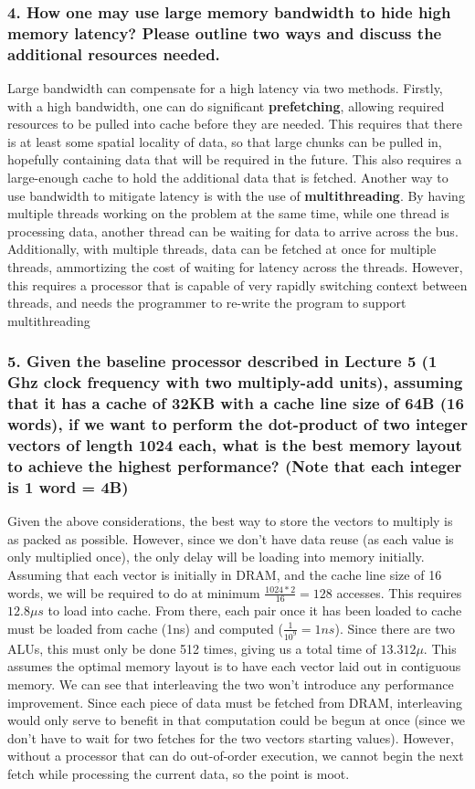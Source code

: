 \documentclass[titlepage]{article}
\begin{document}
\subsubsection*{4. How one may use large memory bandwidth to hide high memory 
latency? Please outline two ways and discuss the additional resources needed.}
Large bandwidth can compensate for a high latency via two methods. Firstly,
with a high bandwidth, one can do significant \textbf{prefetching}, allowing
required resources to be pulled into cache before they are needed. This
requires that there is at least some spatial locality of data, so that large
chunks can be pulled in, hopefully containing data that will be required in the
future. This also requires a large-enough cache to hold the additional data
that is fetched. Another way to use bandwidth to mitigate latency is with the
use of \textbf{multithreading}. By having multiple threads working on the
problem at the same time, while one thread is processing data, another thread
can be waiting for data to arrive across the bus. Additionally, with multiple
threads, data can be fetched at once for multiple threads, ammortizing the cost
of waiting for latency across the threads. However, this requires a processor
that is capable of very rapidly switching context between threads, and needs
the programmer to re-write the program to support multithreading
\subsubsection*{5. Given the baseline processor described in Lecture 5 (1 Ghz 
clock frequency with two multiply-add units), assuming that it has a cache of 
32KB with a cache line size of 64B (16 words), if we want to perform the 
dot-product of two integer vectors of length 1024 each, what is the best memory
layout to achieve the highest performance? (Note that each integer is 
1 word = 4B)}
Given the above considerations, the best way to store the vectors to multiply
is as packed as possible. However, since we don't have data reuse (as each
value is only multiplied once), the only delay will be loading into memory
initially. Assuming that each vector is initially in DRAM, and the cache line
size of 16 words, we will be required to do at minimum $\frac{1024*2}{16} = 128$
accesses. This requires $12.8 \mu s$ to load into cache. From there, each pair
once it has been loaded to cache must be loaded from cache (1ns) and computed
($\frac{1}{10^9} = 1ns$). Since there are two ALUs, this must only be done 512
times, giving us a total time of $13.312 \mu$. This assumes the optimal memory
layout is to have each vector laid out in contiguous memory. We can see that
interleaving the two won't introduce any performance improvement. Since each
piece of data must be fetched from DRAM, interleaving would only serve to
benefit in that computation could be begun at once (since we don't have to wait
for two fetches for the two vectors starting values). However, without a
processor that can do out-of-order execution, we cannot begin the next fetch
while processing the current data, so the point is moot.
\end{document}
